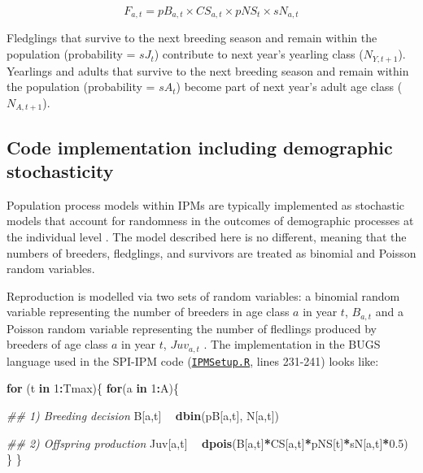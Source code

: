 \documentclass[
]{book}
\newenvironment{Shaded}{\begin{snugshade}}{\end{snugshade}}
\newcommand{\CommentTok}[1]{\textcolor[rgb]{0.56,0.35,0.01}{\textit{#1}}}
\newcommand{\ControlFlowTok}[1]{\textcolor[rgb]{0.13,0.29,0.53}{\textbf{#1}}}
\newcommand{\DecValTok}[1]{\textcolor[rgb]{0.00,0.00,0.81}{#1}}
\newcommand{\FloatTok}[1]{\textcolor[rgb]{0.00,0.00,0.81}{#1}}
\newcommand{\KeywordTok}[1]{\textcolor[rgb]{0.13,0.29,0.53}{\textbf{#1}}}
\newcommand{\NormalTok}[1]{#1}
\newcommand{\OperatorTok}[1]{\textcolor[rgb]{0.81,0.36,0.00}{\textbf{#1}}}
\newcommand{\StringTok}[1]{\textcolor[rgb]{0.31,0.60,0.02}{#1}}
\begin{document}
\begin{equation}
F_{a,t}= pB_{a,t}\times CS_{a,t}\times pNS_{t}\times sN_{a,t}
\end{equation}

Fledglings that survive to the next breeding season and remain within the
population (probability = \(sJ_t\)) contribute to next year's yearling class
(\(N_{Y,t+1}\)). Yearlings and adults that survive to the next breeding season and
remain within the population (probability = \(sA_t\)) become part of next year's
adult age class (\(N_{A,t+1}\)).

\hypertarget{code-implementation-including-demographic-stochasticity}{%
\subsection{Code implementation including demographic stochasticity}\label{code-implementation-including-demographic-stochasticity}}

Population process models within IPMs are typically implemented as stochastic
models that account for randomness in the outcomes of demographic processes at
the individual level \citep[``demographic stochasticity'',][]{Caswell2001, kery2011}.
The model described here is no different, meaning that the numbers of breeders,
fledglings, and survivors are treated as binomial and Poisson random variables.

Reproduction is modelled via two sets of random variables: a binomial random
variable representing the number of breeders in age class \(a\) in year \(t\),
\(B_{a,t}\) and a Poisson random variable representing the
number of fledlings produced by breeders of age class \(a\) in year \(t\),
\(Juv_{a,t}\) . The implementation in the BUGS language used in the
SPI-IPM code (\href{https://github.com/SPI-Birds/SPI-IPM/blob/main/SPI-IPM_Code/02-04_IPM_Setup\&Run/IPMSetup.R}{\texttt{IPMSetup.R}}, lines 231-241) looks like:

\begin{Shaded}
\begin{Highlighting}[]
\ControlFlowTok{for}\NormalTok{ (t }\ControlFlowTok{in} \DecValTok{1}\OperatorTok{:}\NormalTok{Tmax)\{}
  \ControlFlowTok{for}\NormalTok{(a }\ControlFlowTok{in} \DecValTok{1}\OperatorTok{:}\NormalTok{A)\{}
    
    \CommentTok{## 1) Breeding decision}
\NormalTok{    B[a,t] }\OperatorTok{~}\StringTok{ }\KeywordTok{dbin}\NormalTok{(pB[a,t], N[a,t])}
    
    \CommentTok{## 2) Offspring production}
\NormalTok{    Juv[a,t] }\OperatorTok{~}\StringTok{ }\KeywordTok{dpois}\NormalTok{(B[a,t]}\OperatorTok{*}\NormalTok{CS[a,t]}\OperatorTok{*}\NormalTok{pNS[t]}\OperatorTok{*}\NormalTok{sN[a,t]}\OperatorTok{*}\FloatTok{0.5}\NormalTok{)}
\NormalTok{  \}}
\NormalTok{\}}
\end{Highlighting}
\end{Shaded}
\end{document}

